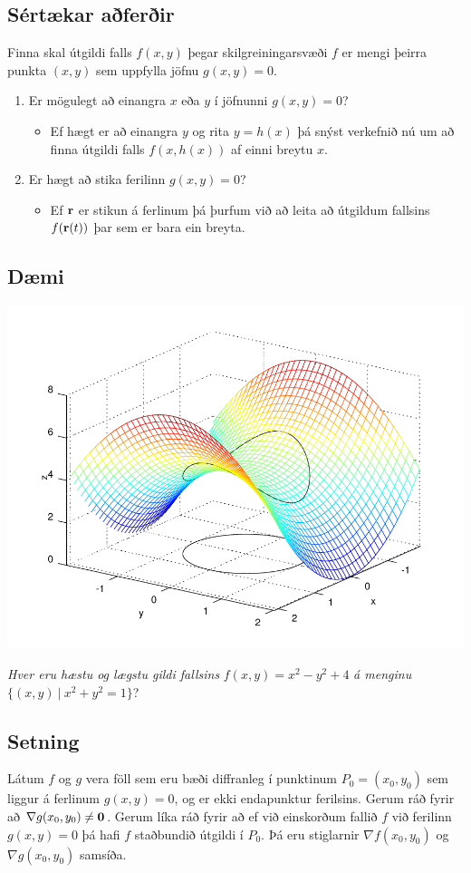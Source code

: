 \documentclass[a4paper,10pt,icelandic]{sphinxmanual}
\begin{document}
\subsection{Sértækar aðferðir}
\label{Kafli3:sertaekar-aferir}
Finna skal útgildi falls \(f(x,y)\) þegar skilgreiningarsvæði
\(f\) er mengi þeirra punkta \((x,y)\) sem uppfylla jöfnu
\(g(x,y)=0\).
\begin{enumerate}
\item {} 
Er mögulegt að einangra \(x\) eða \(y\) í jöfnunni
\(g(x,y)=0\)?
\begin{itemize}
\item {} 
Ef hægt er að einangra \(y\) og rita \(y=h(x)\) þá snýst
verkefnið nú um að finna útgildi falls \(f(x,h(x))\) af einni
breytu \(x\).

\end{itemize}

\item {} 
Er hægt að stika ferilinn \(g(x,y)=0\)?
\begin{itemize}
\item {} 
Ef \(\mbox{${\bf r}$}\) er stikun á ferlinum þá þurfum við að
leita að útgildum fallsins \(f(\mbox{${\bf r}$}(t))\) þar sem
er bara ein breyta.

\end{itemize}

\end{enumerate}


\subsection{Dæmi}
\label{Kafli3:id11}
{\hfill\includegraphics[width=0.600\linewidth]{constraint.png}\hfill}

\emph{Hver eru hæstu og lægstu gildi fallsins} \(f(x,y) = x^2-y^2+4\) \emph{á
menginu} \(\{(x,y)~|~x^2+y^2=1\}\)?


\subsection{Setning}
\label{Kafli3:id12}
Látum \(f\) og \(g\) vera föll sem eru bæði diffranleg í
punktinum \(P_0=(x_0,y_0)\) sem liggur á ferlinum \(g(x,y)=0\),
og er ekki endapunktur ferilsins. Gerum ráð fyrir að
\(\nabla g(x_0,y_0)\neq \mbox{${\bf 0}$}\). Gerum líka ráð fyrir að
ef við einskorðum fallið \(f\) við ferilinn \(g(x,y)=0\) þá hafi
\(f\) staðbundið útgildi í \(P_0\). Þá eru stiglarnir
\(\nabla f(x_0,y_0)\) og \(\nabla g(x_0,y_0)\) samsíða.
\end{document}
